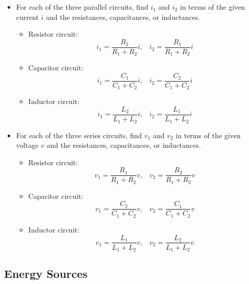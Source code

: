 \documentclass{article}
\begin{document}
\begin{itemize}
\item For each of the three parallel circuits, find $i_1$ and $i_2$ in
  terms of the given current $i$ and the resistances, capacitances, or
  inductances.
  \begin{itemize}
  \item Resistor circuit:
    \begin{equation}
      i_1=\frac{R_2}{R_1+R_2}i,\;\;\;i_2=\frac{R_1}{R_1+R_2}i
    \end{equation}
  \item Capacitor circuit:
    \begin{equation}
      i_1=\frac{C_1}{C_1+C_2}i,\;\;\;i_2=\frac{C_2}{C_1+C_2}i
    \end{equation}
  \item Inductor circuit:
    \begin{equation}
      i_1=\frac{L_2}{L_1+L_2}i,\;\;\;i_2=\frac{L_1}{L_1+L_2}i
    \end{equation}
  \end{itemize}
\item For each of the three series circuits, find $v_1$ and $v_2$ in
  terms of the given voltage $v$ and the resistances, capacitances, or 
  inductances.
  \begin{itemize}
  \item Resistor circuit:
    \begin{equation}
      v_1=\frac{R_1}{R_1+R_2}v,\;\;\;v_2=\frac{R_2}{R_1+R_2}v
    \end{equation}
  \item Capacitor circuit:
    \begin{equation}
      v_1=\frac{C_2}{C_1+C_2}v,\;\;\;v_2=\frac{C_1}{C_1+C_2}v
    \end{equation}
  \item Inductor circuit:
    \begin{equation}
      v_1=\frac{L_1}{L_1+L_2}v,\;\;\;v_2=\frac{L_2}{L_1+L_2}v
    \end{equation}
  \end{itemize}

\end{itemize}



\subsection*{Energy Sources}
\end{document}
